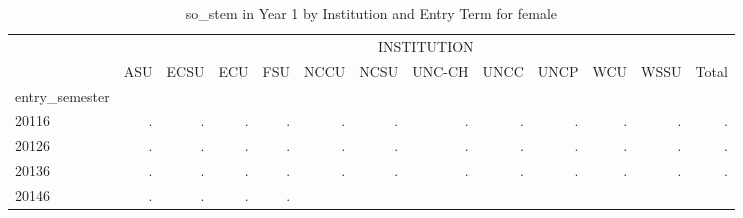 \begin{table}[!h]
\caption{so\_stem in Year 1 by Institution and Entry Term for female}
\centering
\begin{tabular}{lllllllllllll}
\cline{1-13}
\multicolumn{1}{c}{} &
  \multicolumn{12}{|c}{INSTITUTION} \\
\multicolumn{1}{c}{} &
  \multicolumn{1}{|r}{ASU} &
  \multicolumn{1}{r}{ECSU} &
  \multicolumn{1}{r}{ECU} &
  \multicolumn{1}{r}{FSU} &
  \multicolumn{1}{r}{NCCU} &
  \multicolumn{1}{r}{NCSU} &
  \multicolumn{1}{r}{UNC-CH} &
  \multicolumn{1}{r}{UNCC} &
  \multicolumn{1}{r}{UNCP} &
  \multicolumn{1}{r}{WCU} &
  \multicolumn{1}{r}{WSSU} &
  \multicolumn{1}{r}{Total} \\
\cline{1-13}
\multicolumn{1}{l}{entry\_semester} &
  \multicolumn{1}{|r}{} &
  \multicolumn{1}{r}{} &
  \multicolumn{1}{r}{} &
  \multicolumn{1}{r}{} &
  \multicolumn{1}{r}{} &
  \multicolumn{1}{r}{} &
  \multicolumn{1}{r}{} &
  \multicolumn{1}{r}{} &
  \multicolumn{1}{r}{} &
  \multicolumn{1}{r}{} &
  \multicolumn{1}{r}{} &
  \multicolumn{1}{r}{} \\
\multicolumn{1}{l}{\hspace{1em}20116} &
  \multicolumn{1}{|r}{.} &
  \multicolumn{1}{r}{.} &
  \multicolumn{1}{r}{.} &
  \multicolumn{1}{r}{.} &
  \multicolumn{1}{r}{.} &
  \multicolumn{1}{r}{.} &
  \multicolumn{1}{r}{.} &
  \multicolumn{1}{r}{.} &
  \multicolumn{1}{r}{.} &
  \multicolumn{1}{r}{.} &
  \multicolumn{1}{r}{.} &
  \multicolumn{1}{r}{.} \\
\multicolumn{1}{l}{\hspace{1em}20126} &
  \multicolumn{1}{|r}{.} &
  \multicolumn{1}{r}{.} &
  \multicolumn{1}{r}{.} &
  \multicolumn{1}{r}{.} &
  \multicolumn{1}{r}{.} &
  \multicolumn{1}{r}{.} &
  \multicolumn{1}{r}{.} &
  \multicolumn{1}{r}{.} &
  \multicolumn{1}{r}{.} &
  \multicolumn{1}{r}{.} &
  \multicolumn{1}{r}{.} &
  \multicolumn{1}{r}{.} \\
\multicolumn{1}{l}{\hspace{1em}20136} &
  \multicolumn{1}{|r}{.} &
  \multicolumn{1}{r}{.} &
  \multicolumn{1}{r}{.} &
  \multicolumn{1}{r}{.} &
  \multicolumn{1}{r}{.} &
  \multicolumn{1}{r}{.} &
  \multicolumn{1}{r}{.} &
  \multicolumn{1}{r}{.} &
  \multicolumn{1}{r}{.} &
  \multicolumn{1}{r}{.} &
  \multicolumn{1}{r}{.} &
  \multicolumn{1}{r}{.} \\
\multicolumn{1}{l}{\hspace{1em}20146} &
  \multicolumn{1}{|r}{.} &
  \multicolumn{1}{r}{.} &
  \multicolumn{1}{r}{.} &
  \multicolumn{1}{r}{.} &

\end{tabular}
\end{table}
